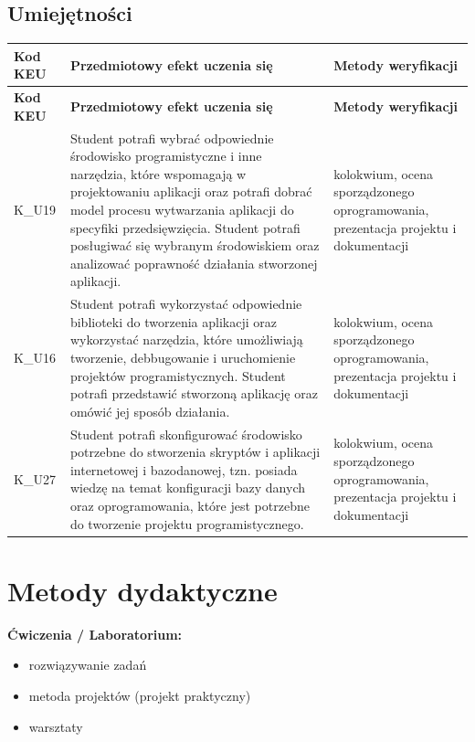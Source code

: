 \documentclass[12pt, a4paper]{article}
\newcommand{\thdrule}{\noalign{\global\setlength{\extrarowheight}{0pt}}}
\newcommand{\thdend}{\noalign{\global\setlength{\extrarowheight}{3pt}}}
\begin{document}
\subsection*{Umiejętności}
{\scriptsize
\begin{longtable}{m{1.6cm}m{9.0cm}m{4.2cm}}
\thdrule\toprule
\rowcolor{pjatkRed} {\color{white}\footnotesize\textbf{\vphantom{Ag}Kod KEU}} & {\color{white}\footnotesize\textbf{\vphantom{Ag}Przedmiotowy efekt uczenia się}} & {\color{white}\footnotesize\textbf{\vphantom{Ag}Metody weryfikacji}} \\
\midrule\thdend
\endfirsthead
\thdrule\toprule
\rowcolor{pjatkRed} {\color{white}\footnotesize\textbf{\vphantom{Ag}Kod KEU}} & {\color{white}\footnotesize\textbf{\vphantom{Ag}Przedmiotowy efekt uczenia się}} & {\color{white}\footnotesize\textbf{\vphantom{Ag}Metody weryfikacji}} \\
\midrule\thdend
\endhead
  \rowcolor{tableRowLight} K\_U19 & Student potrafi wybrać odpowiednie środowisko programistyczne i inne narzędzia, które wspomagają w projektowaniu aplikacji oraz potrafi dobrać model procesu wytwarzania aplikacji  do specyfiki przedsięwzięcia. Student potrafi posługiwać się wybranym środowiskiem oraz analizować poprawność działania stworzonej aplikacji. & kolokwium, ocena sporządzonego oprogramowania, prezentacja projektu i dokumentacji \\
  \rowcolor{tableRowAlt} K\_U16 & Student potrafi wykorzystać odpowiednie biblioteki do tworzenia aplikacji oraz wykorzystać narzędzia, które umożliwiają tworzenie,  debbugowanie i uruchomienie projektów programistycznych. Student potrafi przedstawić stworzoną aplikację oraz omówić jej sposób działania. & kolokwium, ocena sporządzonego oprogramowania, prezentacja projektu i dokumentacji \\
  \rowcolor{tableRowLight} K\_U27 & Student potrafi skonfigurować środowisko potrzebne do stworzenia skryptów i aplikacji internetowej i bazodanowej, tzn. posiada wiedzę na temat konfiguracji bazy danych oraz oprogramowania, które jest potrzebne do tworzenie projektu programistycznego. & kolokwium, ocena sporządzonego oprogramowania, prezentacja projektu i dokumentacji \\
\bottomrule
\end{longtable}}

\section{Metody dydaktyczne}

\textbf{Ćwiczenia / Laboratorium:}
\begin{itemize}
  \item rozwiązywanie zadań
  \item metoda projektów (projekt praktyczny)
  \item warsztaty
\end{itemize}
\vspace{4pt}
\end{document}
